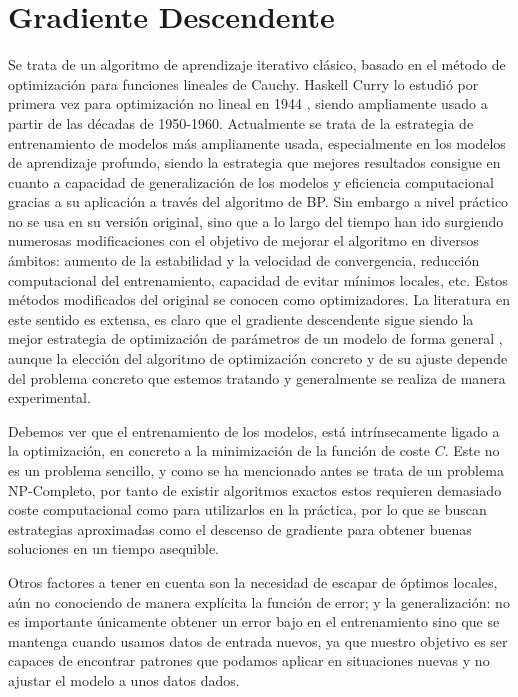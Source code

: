 \section{Gradiente Descendente}

Se trata de un algoritmo de aprendizaje iterativo clásico, basado en el método de optimización para funciones lineales de Cauchy. Haskell Curry lo estudió por primera vez para optimización no lineal en 1944 \cite{Curry1944GDNoLin}, siendo ampliamente usado a partir de las décadas de 1950-1960. Actualmente se trata de la estrategia de entrenamiento de modelos más ampliamente usada, especialmente en los modelos de aprendizaje profundo, siendo la estrategia que mejores resultados consigue en cuanto a capacidad de generalización de los modelos y eficiencia computacional gracias a su aplicación a través del algoritmo de BP. Sin embargo a nivel práctico no se usa en su versión original, sino que a lo largo del tiempo han ido surgiendo numerosas modificaciones con el objetivo de mejorar el algoritmo en diversos ámbitos: aumento de la estabilidad y la velocidad de convergencia, reducción computacional del entrenamiento, capacidad de evitar mínimos locales, etc. Estos métodos modificados del original se conocen como optimizadores. La literatura en este sentido es extensa, es claro que el gradiente descendente sigue siendo la mejor estrategia de optimización de parámetros de un modelo de forma general \cite{MHtrainingClase}, aunque la elección del algoritmo de optimización concreto y de su ajuste depende del problema concreto que estemos tratando y generalmente se realiza de manera experimental. 

Debemos ver que el entrenamiento de los modelos, está intrínsecamente ligado a la optimización, en concreto a la minimización de la función de coste $C$. Este no es un problema sencillo, y como se ha mencionado antes se trata de un problema NP-Completo, por tanto de existir algoritmos exactos estos requieren demasiado coste computacional como para utilizarlos en la práctica, por lo que se buscan estrategias aproximadas como el descenso de gradiente para obtener buenas soluciones en un tiempo asequible. 

Otros factores a tener en cuenta son la necesidad de escapar de óptimos locales, aún no conociendo de manera explícita la función de error; y la generalización: no es  importante únicamente obtener un error bajo en el entrenamiento sino que se mantenga cuando usamos datos de entrada nuevos, ya que nuestro objetivo es ser capaces de encontrar patrones que podamos aplicar en situaciones nuevas y no ajustar el modelo a unos datos dados.

